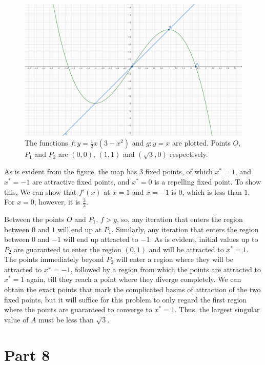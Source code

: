 \documentclass{article}
\begin{document}
\begin{figure}
\centering
\includegraphics[width=1\linewidth]{schulz-iteration.png}
\caption{\label{fig:Schulz Iteration} The functions $f: y = \frac{1}{2}x(3 - x^2)$ and $g:y=x$ are plotted. Points $O$, $P_1$ and $P_2$ are $(0,0)$, $(1, 1)$ and $(\sqrt{3}, 0)$ respectively.}
\end{figure}
\begin{flushleft}
As is evident from the figure, the map has 3 fixed points, of which $x^*=1$, and $x^*=-1$ are attractive fixed points, and $x^*=0$ is a repelling fixed point. To show this, We can show that $f'(x)$ at $x=1$ and $x=-1$ is $0$, which is less than $1$. For $x=0$, however, it is $\frac{3}{2}$.
\newline
\vspace{1mm}

Between the points $O$ and $P_1$, $f > g$, so, any iteration that enters the region between $0$ and $1$ will end up at $P_1$. Similarly, any iteration that enters the region between $0$ and $-1$ will end up attracted to $-1$. As is evident, initial values up to $P_2$ are guaranteed to enter the region $(0, 1)$ and will be attracted to $x^*=1$. The points immediately beyond $P_2$ will enter a region where they will be attracted to $x*=-1$, followed by a region from which the points are attracted to $x^*=1$ again, till they reach a point where they diverge completely. We can obtain the exact points that mark the complicated basins of attraction of the two fixed points, but it will suffice for this problem to only regard the first region where the points are guaranteed to converge to $x^*=1$. Thus, the largest singular value of $A$ must be less than $\sqrt{3}$. 
\end{flushleft}
\newpage
\section{Part 8}
\end{document}
